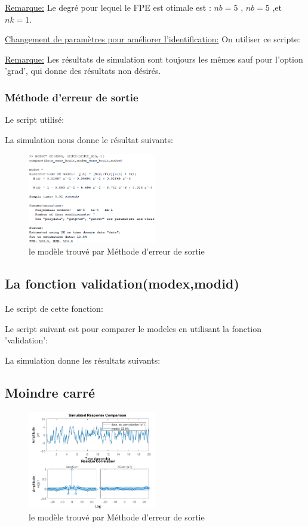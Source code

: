\documentclass[twoside,twocolumn]{article}
\begin{document}
\underline{Remarque:}
Le degré pour lequel le FPE est otimale est : $nb = 5$ , $nb=5$ ,et $nk=1$. 

\underline{Changement de paramètres pour améliorer l'identification:}
On utiliser ce scripte:
\label{matlab}


\underline{Remarque:}
Les résultats de simulation sont toujours les mêmes sauf pour l'option 'grad', qui donne des résultats non désirés.

\subsubsection{Méthode d'erreur de sortie}
Le script utilisé:
\label{matlab}

La simulation nous donne le résultat suivants:
\begin{figure}[H]
\centering
\includegraphics[width=0.5\textwidth]{Images/8.png}
\caption{ le modèle trouvé par Méthode d'erreur de sortie}
\end{figure}

\subsection{La fonction validation(modex,modid)}
Le script de cette fonction:
\label{matlab}


Le script suivant est pour comparer le modeles en utilisant la fonction 'validation':
\label{matlab}


La simulation donne les résultats suivants:
\subsection{Moindre carré}
\begin{figure}[H]
\centering
\includegraphics[width=0.5\textwidth]{Images/10.png}
\caption{ le modèle trouvé par Méthode d'erreur de sortie}
\end{figure}
\end{document}
